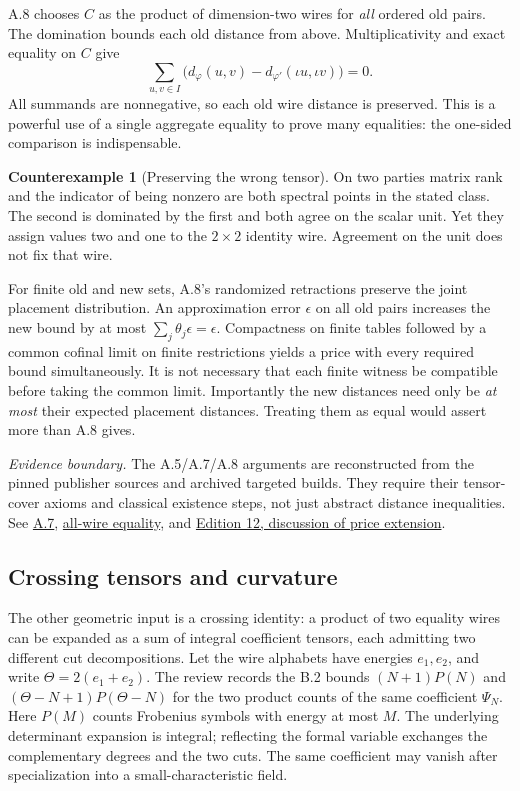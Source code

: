 \documentclass[11pt,letterpaper]{article}
\theoremstyle{definition}\newtheorem{definition}[theorem]{Definition}\newtheorem{example}[theorem]{Example}
\newtheorem{counterexample}[theorem]{Counterexample}
\theoremstyle{remark}\newtheorem{remark}[theorem]{Remark}
\newcommand{\pub}[3]{\href{https://github.com/anthropics/formal-math/blob/11b6c7e3c927df2658f513b6b68ea7f8929c62c5/vp-vnp/#1\#L#2}{#3}}
\newcommand{\aud}[2]{\href{https://github.com/nousentllc/VP-VNP-Review/blob/567303d0bcf4f9d54390437b137752446e58ccd6/#1}{#2}}
\newcommand{\scope}[1]{\par\smallskip\noindent\textit{Evidence boundary.} #1\par\smallskip}
\begin{document}
A.8 chooses $C$ as the product of dimension-two wires for \emph{all} ordered old pairs. The domination bounds each old distance from above. Multiplicativity and exact equality on $C$ give
\[
 \sum_{u,v\in I}\bigl(d_\varphi(u,v)-d_{\varphi'}(\iota u,\iota v)\bigr)=0.
\]
All summands are nonnegative, so each old wire distance is preserved. This is a powerful use of a single aggregate equality to prove many equalities: the one-sided comparison is indispensable.
\begin{counterexample}[Preserving the wrong tensor]
On two parties matrix rank and the indicator of being nonzero are both spectral points in the stated class. The second is dominated by the first and both agree on the scalar unit. Yet they assign values two and one to the $2\times2$ identity wire. Agreement on the unit does not fix that wire.
\end{counterexample}
For finite old and new sets, A.8's randomized retractions preserve the joint placement distribution. An approximation error $\epsilon$ on all old pairs increases the new bound by at most $\sum_j\theta_j\epsilon=\epsilon$. Compactness on finite tables followed by a common cofinal limit on finite restrictions yields a price with every required bound simultaneously. It is not necessary that each finite witness be compatible before taking the common limit. Importantly the new distances need only be \emph{at most} their expected placement distances. Treating them as equal would assert more than A.8 gives.

\scope{The A.5/A.7/A.8 arguments are reconstructed from the pinned publisher sources and archived targeted builds. They require their tensor-cover axioms and classical existence steps, not just abstract distance inequalities. See \pub{Paper/Extension.lean}{166}{A.7}, \pub{Paper/Prices.lean}{160}{all-wire equality}, and \aud{report/VP_VNP_Research_Review.pdf}{Edition 12, discussion of price extension}.}

\subsection{Crossing tensors and curvature}\label{sec:curvature}
The other geometric input is a crossing identity: a product of two equality wires can be expanded as a sum of integral coefficient tensors, each admitting two different cut decompositions. Let the wire alphabets have energies $e_1,e_2$, and write $\Theta=2(e_1+e_2)$. The review records the B.2 bounds $(N+1)P(N)$ and $(\Theta-N+1)P(\Theta-N)$ for the two product counts of the same coefficient $\Psi_N$. Here $P(M)$ counts Frobenius symbols with energy at most $M$. The underlying determinant expansion is integral; reflecting the formal variable exchanges the complementary degrees and the two cuts. The same coefficient may vanish after specialization into a small-characteristic field.
\end{document}
